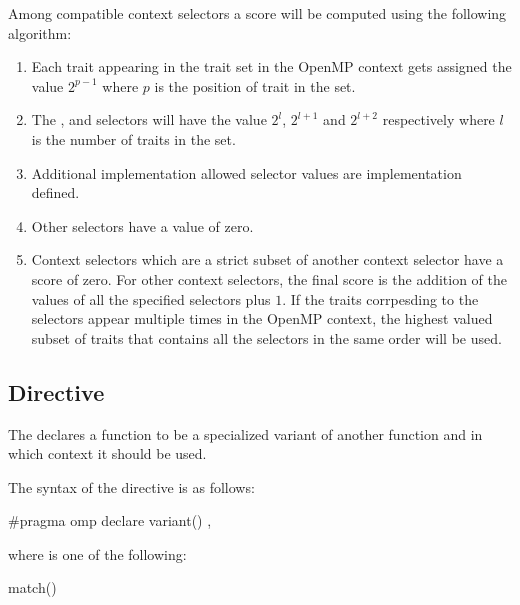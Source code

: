Among compatible context selectors a score will be computed using the following algorithm:
\begin{enumerate}
 \item Each trait appearing in the  trait set in the OpenMP context gets assigned the value $2^{p-1}$ where $p$ is the position of trait in the set.
 \item The ,  and  selectors will have the value $2^{l}$, $2^{l+1}$ and $2^{l+2}$ respectively where $l$ is the number of traits in the  set.
 \item Additional implementation allowed selector values are implementation defined.
 \item Other selectors have a value of zero.
 \item Context selectors which are a strict subset of another context selector have a score of zero. For other context selectors, the final score is the addition of the values of all the specified selectors plus $1$. If the traits corrpesding to the  selectors appear multiple times in the OpenMP context, the highest valued subset of traits that contains all the selectors in the same order will be used.
\end{enumerate}

\subsection{ Directive}
\label{subsec:declare variant Directive}
\summary
The  declares a function to be a specialized variant of another function and in which context it should be used.

\syntax
\begin{ccppspecific}
\begin{samepage}
The syntax of the  directive is as follows:

\begin{ompcPragma}
#pragma omp declare variant() \plc{[clause[ [},\plc{] clause] ... ] new-line}
\end{ompcPragma}
\end{samepage}

\begin{samepage}
where  is one of the following{}:

\begin{indentedcodelist}
match()
\end{indentedcodelist}
\end{samepage}
\end{ccppspecific}

